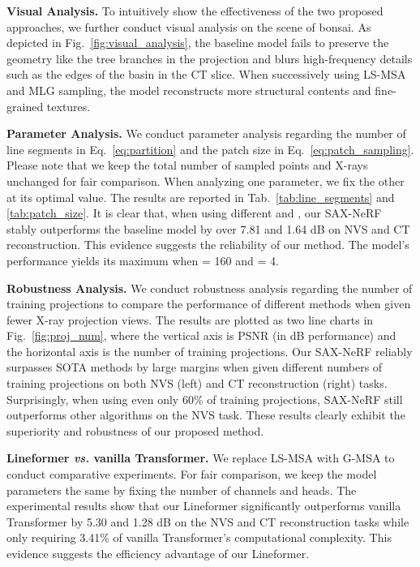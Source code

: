 \documentclass[10pt,twocolumn,letterpaper]{article}
\begin{document}
\vspace{0.5mm}
\noindent\textbf{Visual Analysis.} To intuitively show the effectiveness of the two proposed approaches, we further conduct visual analysis on the scene of bonsai. As depicted in Fig.~\ref{fig:visual_analysis}, the baseline model fails to preserve the geometry like the tree branches in the projection and blurs high-frequency details such as the edges of the basin in the CT slice. When successively using LS-MSA and MLG sampling, the model reconstructs more structural contents and fine-grained textures. 

\vspace{0.5mm}
\noindent\textbf{Parameter Analysis.} We conduct parameter analysis regarding the number of line segments  in Eq.~\eqref{eq:partition} and the patch size  in Eq.~\eqref{eq:patch_sampling}. Please note that we keep the total number of sampled points and X-rays unchanged for fair comparison. When analyzing one parameter, we fix the other at its optimal value. The results are reported in Tab.~\ref{tab:line_segments} and \ref{tab:patch_size}. It is clear that, when using different  and , our SAX-NeRF stably outperforms the baseline model by over 7.81 and 1.64 dB on NVS and CT reconstruction. This evidence suggests the reliability of our method. The model's performance yields its maximum when  = 160 and  = 4.

\vspace{0.5mm}
\noindent\textbf{Robustness Analysis.} We conduct robustness analysis regarding the number of training projections to compare the performance of different methods when given fewer X-ray projection views. The results are plotted as two line charts in Fig.~\ref{fig:proj_num}, where the vertical axis is PSNR (in dB performance) and the horizontal axis is the number of training projections.  Our SAX-NeRF reliably surpasses SOTA methods by large margins when given different numbers of training projections on both NVS (left) and CT reconstruction (right) tasks. Surprisingly, when using even only 60\% of training projections, SAX-NeRF still outperforms other algorithms on the NVS task. These results clearly exhibit the superiority and robustness of our proposed method.

\vspace{0.5mm}
\noindent\textbf{Lineformer \emph{vs.} vanilla Transformer.} We replace  LS-MSA with G-MSA to conduct comparative experiments. For fair comparison, we keep the model parameters the same by fixing the number of channels and heads. The experimental results show that our Lineformer significantly outperforms vanilla Transformer by 5.30 and 1.28 dB on the NVS and CT reconstruction tasks while only requiring 3.41\% of vanilla Transformer's computational complexity. This evidence suggests the efficiency advantage of our Lineformer.
\end{document}
